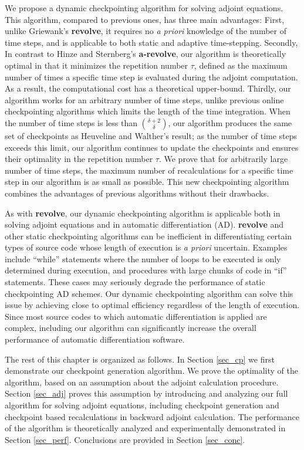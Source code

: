We propose a dynamic checkpointing algorithm for solving adjoint equations.
This algorithm, compared to previous ones, has three main advantages: First,
unlike Griewank's {\bf revolve}, it requires no {\it a priori}
knowledge of the number
of time steps, and is applicable to both static and adaptive time-stepping.
Secondly, In contrast to Hinze and Sternberg's {\bf a-revolve}, our algorithm
is theoretically optimal in that it minimizes the repetition number $\tau$,
defined as the maximum number of times a specific time step is evaluated during
the adjoint computation.  As a result, the computational cost has a theoretical
upper-bound.  Thirdly, our
algorithm works for an arbitrary number of time steps, unlike previous online
checkpointing algorithms which limits the
length of the time integration.  When the number of time steps is less than
$\binom{\delta + 2}{\delta}$, our algorithm produces the same set of
checkpoints as Heuveline and Walther's result; as the number of time steps
exceeds this limit, our algorithm continues to update the checkpoints and
ensures their optimality in the repetition number $\tau$.  We prove that for
arbitrarily large number of time steps, the maximum number of recalculations
for a specific time step in our algorithm is as small as possible.  This new
checkpointing algorithm combines the advantages of previous algorithms
without their drawbacks.

As with {\bf revolve}, our dynamic checkpointing algorithm is applicable both
in solving adjoint equations and in automatic differentiation (AD).
{\bf revolve} and other static checkpointing algorithms can be inefficient in
differentiating
certain types of source code whose length of execution is {\it a priori}
uncertain.
Examples include ``while'' statements where the number of loops to be
executed is only determined during execution, and procedures with large chunks
of code in ``if'' statements.  These cases may seriously degrade the
performance of static checkpointing AD schemes.  Our dynamic checkpointing
algorithm can solve this issue by achieving close to optimal efficiency
regardless of the length of execution.  Since most source codes to which
automatic differentiation is applied are complex, including our algorithm
can significantly increase the overall performance of automatic differentiation
software.

The rest of this chapter is organized as follows.  In Section \ref{sec_cp}
we first demonstrate our checkpoint generation algorithm.  We prove the
optimality of the algorithm, based on an assumption about the adjoint
calculation procedure.  Section \ref{sec_adj} proves this assumption by
introducing and analyzing our full algorithm for solving adjoint equations,
including checkpoint generation and checkpoint based recalculations in
backward adjoint calculation.  The performance of the algorithm is theoretically
analyzed and experimentally demonstrated in Section \ref{sec_perf}.
Conclusions are provided in Section \ref{sec_conc}.





